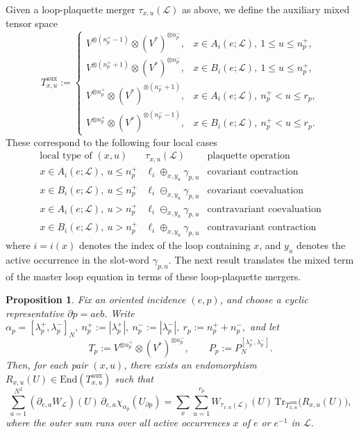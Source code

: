 \documentclass[11pt,a4paper,reqno]{article}
\newtheorem{proposition}[theorem]{Proposition}
\theoremstyle{definition}
\theoremstyle{remark}
\newcommand\Lc{{\mathcal{L}}}
\begin{document}
Given a loop-plaquette merger $\tau_{x,u}(\Lc)$ as above, we define the auxiliary mixed tensor space
\[
T^{\mathrm{aux}}_{x,u}:=
\begin{cases}
V^{\otimes(n_p^+-1)}\otimes (V^*)^{\otimes n_p^-}, & x\in A_i(e;\Lc),\ 1\le u\le n_p^+,\\[1mm]
V^{\otimes(n_p^++1)}\otimes (V^*)^{\otimes n_p^-}, & x\in B_i(e;\Lc),\ 1\le u\le n_p^+,\\[1mm]
V^{\otimes n_p^+}\otimes (V^*)^{\otimes(n_p^-+1)}, & x\in A_i(e;\Lc),\ n_p^+<u\le r_p,\\[1mm]
V^{\otimes n_p^+}\otimes (V^*)^{\otimes(n_p^--1)}, & x\in B_i(e;\Lc),\ n_p^+<u\le r_p.
\end{cases}
\]
These correspond to the following four local cases
\[
\begin{array}{c|c|c}
\text{local type of }(x,u) & \tau_{x,u}(\Lc) & \text{plaquette operation} \\ \hline
x\in A_i(e;\Lc),\ u\le n_p^+ & \ell_i\oplus_{x,y_u}\gamma_{p,u} & \text{covariant contraction} \\
x\in B_i(e;\Lc),\ u\le n_p^+ & \ell_i\ominus_{x,y_u}\gamma_{p,u} & \text{covariant coevaluation} \\
x\in A_i(e;\Lc),\ u>n_p^+ & \ell_i\ominus_{x,y_u}\gamma_{p,u} & \text{contravariant coevaluation} \\
x\in B_i(e;\Lc),\ u>n_p^+ & \ell_i\oplus_{x,y_u}\gamma_{p,u} & \text{contravariant contraction}
\end{array}
\]
where $i=i(x)$ denotes the index of the loop containing $x$, and $y_u$ denotes the active occurrence in the slot-word $\gamma_{p,u}$. The next result translates the mixed term of the master loop equation in terms of these loop-plaquette mergers.

\begin{proposition}\label{prop:local-incidence-tensor}
Fix an oriented incidence $(e,p)$, and choose a cyclic representative $\partial p=aeb$. Write $\alpha_p=[\lambda_p^+,\lambda_p^-]_N,\ n_p^+:=|\lambda_p^+|,\ n_p^-:=|\lambda_p^-|,\ r_p:=n_p^++n_p^-,$ and let
\[
T_p:=V^{\otimes n_p^+}\otimes (V^*)^{\otimes n_p^-},\qquad P_p:=P^{[\lambda_p^+,\lambda_p^-]}_N.
\]
Then, for each pair $(x,u)$, there exists an endomorphism $R_{x,u}(U)\in \mathrm{End}(T^{\mathrm{aux}}_{x,u})$ such that
\[
\sum_{a=1}^{N^2}(\partial_{e,a}W_\Lc)(U)\,\partial_{e,a}\chi_{\alpha_p}(U_{\partial p})=\sum_x\sum_{u=1}^{r_p} W_{\tau_{x,u}(\Lc)}(U)\,\mathrm{Tr}_{T^{\mathrm{aux}}_{x,u}}\!\bigl(R_{x,u}(U)\bigr),
\]
where the outer sum runs over all active occurrences $x$ of $e$ or $e^{-1}$ in $\Lc$.
\end{proposition}
\end{document}
